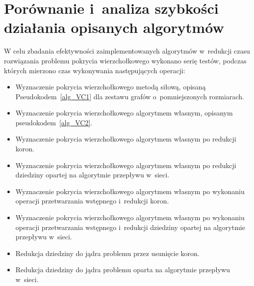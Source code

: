 \section{Porównanie i~analiza szybkości działania opisanych algorytmów}
\par{
  W celu zbadania efektywności zaimplementowanych algorytmów w~redukcji czasu rozwiązania problemu pokrycia wierzchołkowego wykonano serię testów, podczas których mierzono czas wykonywania następujących operacji:

  \begin{itemize}
    \item Wyznaczenie pokrycia wierzchołkowego metodą siłową, opisaną Pseudokodem~\ref{alg_VC1} dla zestawu grafów o~pomniejszonych rozmiarach.
    \item Wyznaczenie pokrycia wierzchołkowego algorytmem własnym, opisanym pseudokodem~\ref{alg_VC2}.
    \item Wyznaczenie pokrycia wierzchołkowego algorytmem własnym po redukcji koron.
    \item Wyznaczenie pokrycia wierzchołkowego algorytmem własnym po redukcji dziedziny opartej na algorytmie przepływu w~sieci.
    \item Wyznaczenie pokrycia wierzchołkowego algorytmem własnym po wykonaniu operacji przetwarzania wstępnego i~redukcji koron.
    \item Wyznaczenie pokrycia wierzchołkowego algorytmem własnym po wykonaniu operacji przetwarzania wstępnego i~redukcji dziedziny opartej na algorytmie przepływu w~sieci.
    \item Redukcja dziedziny do jądra problemu przez usunięcie koron.
    \item Redukcja dziedziny do jądra problemu oparta na algorytmie przepływu w~sieci.
  \end{itemize}
}
